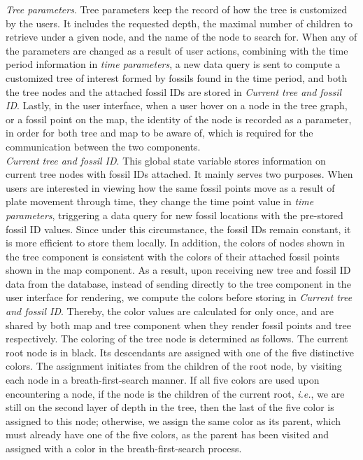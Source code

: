 \documentclass[11pt, a4paper,oneside,chapterprefix=false]{scrbook}
\begin{document}
\emph{Tree parameters}. Tree parameters keep the record of how the tree is customized by the users. It includes the requested depth, the maximal number of children to retrieve under a given node, and the name of the node to search for. When any of the parameters are changed as a result of user actions, combining with the time period information in \emph{time parameters}, a new data query is sent to compute a customized tree of interest formed by fossils found in the time period, and both the tree nodes and the attached fossil IDs are stored in \emph{Current tree and fossil ID}. Lastly, in the user interface, when a user hover on a node in the tree graph, or a fossil point on the map, the identity of the node is recorded as a parameter, in order for both tree and map to be aware of, which is required for the communication between the two components. \\

\emph{Current tree and fossil ID}. This global state variable stores information on current tree nodes with fossil IDs attached. It mainly serves two purposes. When users are interested in viewing how the same fossil points move as a result of plate movement through time, they change the time point value in \emph{time parameters}, triggering a data query for new fossil locations with the pre-stored fossil ID values. Since under this circumstance, the fossil IDs remain constant, it is more efficient to store them locally. In addition, the colors of nodes shown in the tree component is consistent with the colors of their attached fossil points shown in the map component. As a result, upon receiving new tree and fossil ID data from the database, instead of sending directly to the tree component in the user interface for rendering, we compute the colors before storing in \emph{Current tree and fossil ID}. Thereby, the color values are calculated for only once, and are shared by both map and tree component when they render fossil points and tree respectively. The coloring of the tree node is determined as follows. The current root node is in black. Its descendants are assigned with one of the five distinctive colors. The assignment initiates from the children of the root node, by visiting each node in a breath-first-search manner. If all five colors are used upon encountering a node, if the node is the children of the current root, \emph{i.e.}, we are still on the second layer of depth in the tree, then the last of the five color is assigned to this node; otherwise, we assign the same color as its parent, which must already have one of the five colors, as the parent has been visited and assigned with a color in the breath-first-search process. 
\end{document}
